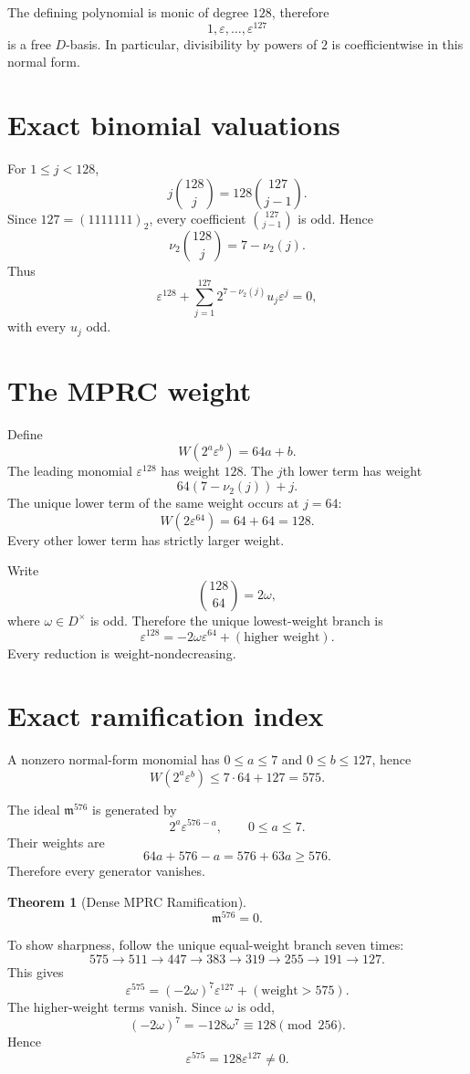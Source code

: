 \documentclass[11pt]{article}
\newtheorem{theorem}{Theorem}
\theoremstyle{definition}
\newcommand{\vtwo}{\nu_2}
\begin{document}
The defining polynomial is monic of degree $128$, therefore
\[
1,\varepsilon,\ldots,\varepsilon^{127}
\]
is a free $D$-basis. In particular, divisibility by powers of $2$ is coefficientwise in this normal form.

\section{Exact binomial valuations}
For $1\le j<128$,
\[
j\binom{128}{j}=128\binom{127}{j-1}.
\]
Since $127=(1111111)_2$, every coefficient $\binom{127}{j-1}$ is odd. Hence
\[
\boxed{
\vtwo\binom{128}{j}=7-\vtwo(j).
}
\]
Thus
\[
\varepsilon^{128}
+
\sum_{j=1}^{127}
2^{7-\vtwo(j)}u_j\varepsilon^j=0,
\]
with every $u_j$ odd.

\section{The MPRC weight}
Define
\[
\boxed{
W(2^a\varepsilon^b)=64a+b.
}
\]
The leading monomial $\varepsilon^{128}$ has weight $128$. The $j$th lower term has weight
\[
64(7-\vtwo(j))+j.
\]
The unique lower term of the same weight occurs at $j=64$:
\[
W(2\varepsilon^{64})=64+64=128.
\]
Every other lower term has strictly larger weight.

Write
\[
\binom{128}{64}=2\omega,
\]
where $\omega\in D^\times$ is odd. Therefore the unique lowest-weight branch is
\[
\varepsilon^{128}
=
-2\omega\varepsilon^{64}
+
(\text{higher weight}).
\]
Every reduction is weight-nondecreasing.

\section{Exact ramification index}
A nonzero normal-form monomial has $0\le a\le7$ and $0\le b\le127$, hence
\[
W(2^a\varepsilon^b)\le7\cdot64+127=575.
\]

The ideal $\mathfrak m^{576}$ is generated by
\[
2^a\varepsilon^{576-a},\qquad 0\le a\le7.
\]
Their weights are
\[
64a+576-a=576+63a\ge576.
\]
Therefore every generator vanishes.

\begin{theorem}[Dense MPRC Ramification]
\[
\boxed{
\mathfrak m^{576}=0.
}
\]
\end{theorem}

To show sharpness, follow the unique equal-weight branch seven times:
\[
575\to511\to447\to383\to319\to255\to191\to127.
\]
This gives
\[
\varepsilon^{575}
=
(-2\omega)^7\varepsilon^{127}
+
(\text{weight}>575).
\]
The higher-weight terms vanish. Since $\omega$ is odd,
\[
(-2\omega)^7=-128\omega^7\equiv128\pmod{256}.
\]
Hence
\[
\boxed{
\varepsilon^{575}=128\varepsilon^{127}\ne0.
}
\]
\end{document}
